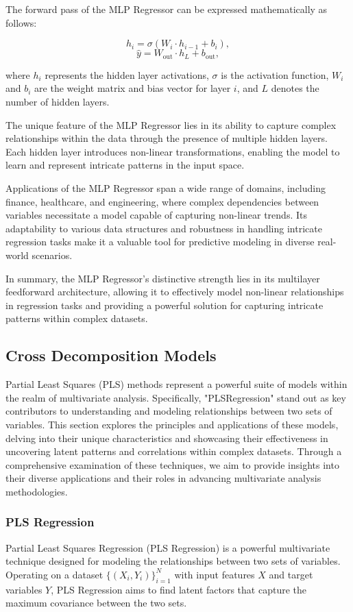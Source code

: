 \documentclass[twocolumn]{article}
\begin{document}
The forward pass of the MLP Regressor can be expressed mathematically as follows:

\[ h_i = \sigma(W_i \cdot h_{i-1} + b_i), \]
\[ \hat{y} = W_{\text{out}} \cdot h_L + b_{\text{out}}, \]

where \(h_i\) represents the hidden layer activations, \(\sigma\) is the activation function, \(W_i\) and \(b_i\) are the weight matrix and bias vector for layer \(i\), and \(L\) denotes the number of hidden layers.

The unique feature of the MLP Regressor lies in its ability to capture complex relationships within the data through the presence of multiple hidden layers. Each hidden layer introduces non-linear transformations, enabling the model to learn and represent intricate patterns in the input space.

Applications of the MLP Regressor span a wide range of domains, including finance, healthcare, and engineering, where complex dependencies between variables necessitate a model capable of capturing non-linear trends. Its adaptability to various data structures and robustness in handling intricate regression tasks make it a valuable tool for predictive modeling in diverse real-world scenarios.

In summary, the MLP Regressor's distinctive strength lies in its multilayer feedforward architecture, allowing it to effectively model non-linear relationships in regression tasks and providing a powerful solution for capturing intricate patterns within complex datasets.
		
	\subsection{Cross Decomposition Models}
Partial Least Squares (PLS) methods represent a powerful suite of models within the realm of multivariate analysis. Specifically, "PLSRegression" stand out as key contributors to understanding and modeling relationships between two sets of variables. This section explores the principles and applications of these models, delving into their unique characteristics and showcasing their effectiveness in uncovering latent patterns and correlations within complex datasets. Through a comprehensive examination of these techniques, we aim to provide insights into their diverse applications and their roles in advancing multivariate analysis methodologies.
		\subsubsection{PLS Regression}
Partial Least Squares Regression (PLS Regression) is a powerful multivariate technique designed for modeling the relationships between two sets of variables. Operating on a dataset \(\{(X_i, Y_i)\}_{i=1}^{N}\) with input features \(X\) and target variables \(Y\), PLS Regression aims to find latent factors that capture the maximum covariance between the two sets.
\end{document}
